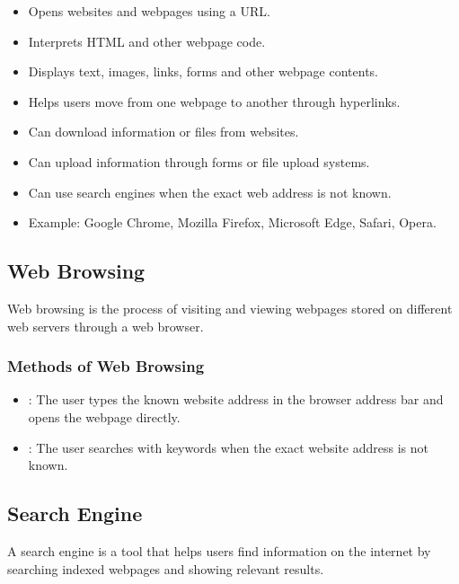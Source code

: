 \begin{itemize}
    \item Opens websites and webpages using a URL.
    \item Interprets HTML and other webpage code.
    \item Displays text, images, links, forms and other webpage contents.
    \item Helps users move from one webpage to another through hyperlinks.
    \item Can download information or files from websites.
    \item Can upload information through forms or file upload systems.
    \item Can use search engines when the exact web address is not known.
    \item Example: Google Chrome, Mozilla Firefox, Microsoft Edge, Safari, Opera.
\end{itemize}

\subsection{Web Browsing}

\begin{definitionbox}
Web browsing is the process of visiting and viewing webpages stored on different web servers through a web browser.
\end{definitionbox}

\subsubsection{Methods of Web Browsing}

\begin{itemize}
    \item {}: The user types the known website address in the browser address bar and opens the webpage directly.
    \item {}: The user searches with keywords when the exact website address is not known.
\end{itemize}


\subsection{Search Engine}

\begin{definitionbox}
A search engine is a tool that helps users find information on the internet by searching indexed webpages and showing relevant results.
\end{definitionbox}

